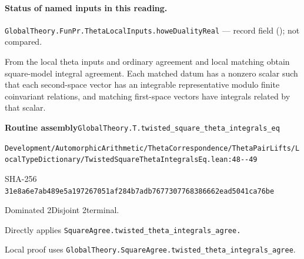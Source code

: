 

\paragraph{Status of named inputs in this reading.}
\noindent\nolinkurl{GlobalTheory.FunPr.ThetaLocalInputs.howeDualityReal} --- record field (); not compared.\par

\begin{formalstatement}[D044]\label{decomp:D044}
From the local theta inputs and ordinary agreement and local matching obtain square-model integral agreement. Each matched datum has a nonzero scalar such that each second-space vector has an integrable representative modulo finite coinvariant relations, and matching first-space vectors have integrals related by that scalar.
\end{formalstatement}
{\small\raggedright\noindent\textsf{\bfseries Routine assembly}\quad \nolinkurl{GlobalTheory.T.twisted_square_theta_integrals_eq}\par\noindent \nolinkurl{Development/AutomorphicArithmetic/ThetaCorrespondence/ThetaPairLifts/LocalTypeDictionary/TwistedSquareThetaIntegralsEq.lean:48--49}\par\noindent SHA-256 \nolinkurl{31e8a6e7ab489e5a197267051af284b7adb7677307768386662ead5041ca76be}\par\noindent Dominated 2\quad Disjoint 2\quad terminal.\par}
Directly applies \nolinkurl{SquareAgree.twisted_theta_integrals_agree.}
{\small\raggedright Local proof uses \nolinkurl{GlobalTheory.SquareAgree.twisted_theta_integrals_agree}.\par}
